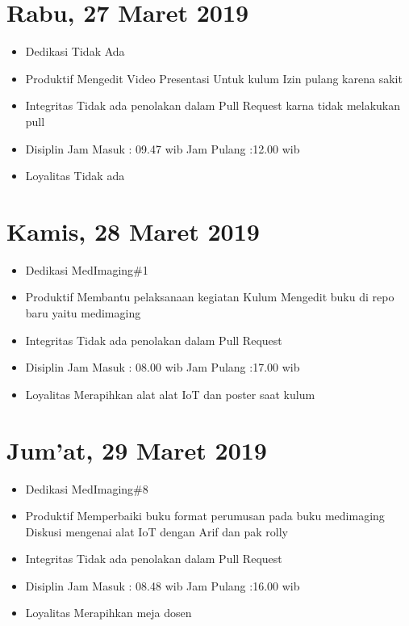 \section{Rabu, 27 Maret 2019}
\begin{itemize}
\item Dedikasi
\subitem Tidak Ada
\item Produktif
  \subitem Mengedit Video Presentasi Untuk kulum
  \subitem Izin pulang karena sakit
\item Integritas
  \subitem Tidak ada penolakan dalam Pull Request karna tidak melakukan pull
\item Disiplin
  \subitem Jam Masuk : 09.47 wib
  \subitem Jam Pulang :12.00 wib
\item Loyalitas
  \subitem Tidak ada
\end{itemize}

\section{Kamis, 28 Maret 2019}
\begin{itemize}
\item Dedikasi
\subitem MedImaging\#1
\item Produktif
  \subitem Membantu pelaksanaan kegiatan Kulum
  \subitem Mengedit buku di repo baru yaitu medimaging
\item Integritas
  \subitem Tidak ada penolakan dalam Pull Request 
\item Disiplin
  \subitem Jam Masuk : 08.00 wib
  \subitem Jam Pulang :17.00 wib
\item Loyalitas
  \subitem Merapihkan alat alat IoT dan poster saat kulum
\end{itemize}

\section{Jum'at, 29 Maret 2019}
\begin{itemize}
\item Dedikasi
\subitem MedImaging\#8
\item Produktif
  \subitem Memperbaiki buku format perumusan pada buku medimaging
  \subitem Diskusi mengenai alat IoT dengan Arif dan pak rolly
\item Integritas
  \subitem Tidak ada penolakan dalam Pull Request 
\item Disiplin
  \subitem Jam Masuk : 08.48 wib
  \subitem Jam Pulang :16.00 wib
\item Loyalitas
  \subitem Merapihkan meja dosen
\end{itemize}

